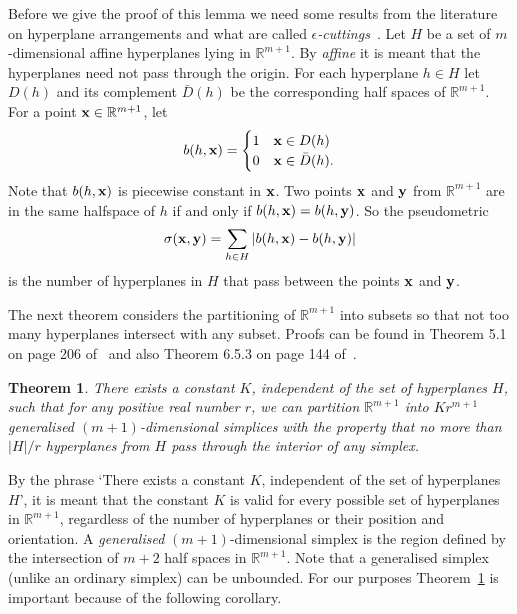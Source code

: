 \documentclass[aap,preprint]{imsart}
\newcommand{\reals}{{\mathbb R}}
\newcommand{\abs}[1]{\left\vert #1 \right\vert}
\newtheorem{theorem}{Theorem}
\begin{document}
Before we give the proof of this lemma we need some results from the literature on hyperplane arrangements and what are called \emph{$\epsilon$-cuttings}~\cite{Chazelle_discrepency_method_2000,Matousek_lect_disc_geom_2002}.  Let $H$ be a set of $m$-dimensional affine hyperplanes lying in $\reals^{m+1}$.  By \emph{affine} it is meant that  the hyperplanes need not pass through the origin.  For each hyperplane $h \in H$ let $D(h)$ and its complement $\bar{D}(h)$ be the corresponding half spaces of $\mathbb{R}^{m+1}$.  For a point $\mathbf{x} \in \mathbb{R}^{m+1}$, let
\begin{equation}\label{eq:bhsi}
b(h,\xbf) = \begin{cases} 
1 & \xbf \in D(h) \\
0 & \xbf \in \bar{D}(h).
\end{cases}
\end{equation}
Note that $b(h,\mathbf{x})$ is piecewise constant in $\mathbf{x}$.  Two points $\mathbf{x}$ and $\mathbf{y}$ from $\reals^{m+1}$ are in the same halfspace of $h$ if and only if $b(h, \mathbf{x}) = b(h, \mathbf{y})$.  So the pseudometric
\[
\sigma(\mathbf{x},\mathbf{y}) = \sum_{h \in H} |b(h,\mathbf{x}) - b(h,\mathbf{y})|
\]
is the number of hyperplanes in $H$ that pass between the points $\mathbf{x}$ and $\mathbf{y}$.  %

The next theorem considers the partitioning of $\reals^{m+1}$ into subsets so that not too many hyperplanes intersect with any subset.  Proofs can be found in Theorem 5.1 on page 206 of~\cite{Chazelle_discrepency_method_2000} and also Theorem 6.5.3 on page 144 of~\cite{Matousek_lect_disc_geom_2002}.

\begin{theorem}\label{thm:epscutting}
There exists a constant $K$, independent of the set of hyperplanes $H$, such that for any positive real number $r$, we can partition $\reals^{m+1}$ into $K r^{m+1}$ generalised $(m+1)$-dimensional simplices with the property that no more than $\abs{H}/r$ hyperplanes from $H$ pass through the interior of any simplex.
\end{theorem}

By the phrase `There exists a constant $K$, independent of the set of hyperplanes $H$', it is meant that the constant $K$ is valid for every possible set of hyperplanes in $\reals^{m+1}$, regardless of the number of hyperplanes or their position and orientation.  A \emph{generalised} $(m+1)$-dimensional simplex is the region defined by the intersection of $m+2$ half spaces in $\reals^{m+1}$.  Note that a generalised simplex (unlike an ordinary simplex) can be unbounded.  For our purposes Theorem~\ref{thm:epscutting} is important because of the following corollary.
\end{document}
